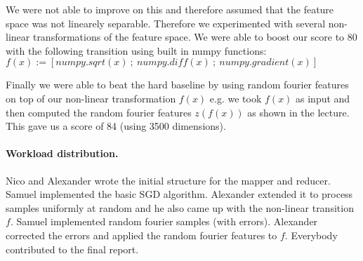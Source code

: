 \documentclass[a4paper, 11pt]{article}
\begin{document}
We were not able to improve on this and therefore assumed that the feature space was not 
linearely separable. Therefore we experimented with several non-linear transformations of the
feature space. We were able to boost our score to 80 with the following transition using built in numpy
functions: $f(x) := [numpy.sqrt(x)\ ;\ numpy.diff(x)\ ;\ numpy.gradient(x)]$

Finally we were able to beat the hard baseline by using random fourier features on top of our non-linear
transformation $f(x)$ e.g. we took $f(x)$ as input and then computed the random fourier features $z(f(x))$ as shown in the lecture.
This gave us a score of 84 (using 3500 dimensions).


\paragraph{Workload distribution.\!\!\!}

Nico and Alexander wrote the initial structure for the mapper and reducer. 
Samuel implemented the basic SGD algorithm. Alexander extended it to process samples
uniformly at random and he also came up with the non-linear transition $f$. 
Samuel implemented random fourier samples (with errors). 
Alexander corrected the errors and applied the random fourier features to $f$.
Everybody contributed to the final report.
\end{document}
